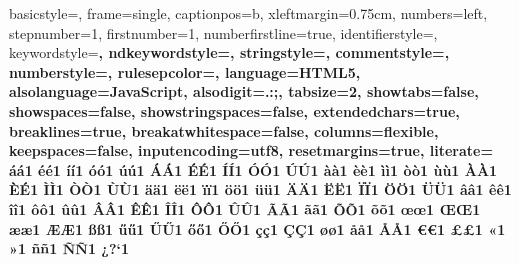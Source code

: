  {%
  basicstyle={\footnotesize\ttfamily},   
  frame=single,
  captionpos=b,
  xleftmargin={0.75cm},
  numbers=left,
  stepnumber=1,
  firstnumber=1,
  numberfirstline=true,	
  identifierstyle=\color{black},
  keywordstyle=\color{blue}\bfseries,
  ndkeywordstyle=\color{editorGreen}\bfseries,
  stringstyle=\color{editorOcher}\ttfamily,
  commentstyle=\color{brown}\ttfamily,
  numberstyle=\color{Gray},
  rulesepcolor=\color{lightgray},
  language=HTML5,
  alsolanguage=JavaScript,
  alsodigit={.:;},	
  tabsize=2,
  showtabs=false,
  showspaces=false,
  showstringspaces=false,
  extendedchars=true,
  breaklines=true,
  breakatwhitespace=false,
  columns=flexible,
  keepspaces=false,
  inputencoding=utf8,
  resetmargins=true,
  literate=
  {á}{{\'a}}1 {é}{{\'e}}1 {í}{{\'i}}1 {ó}{{\'o}}1 {ú}{{\'u}}1
  {Á}{{\'A}}1 {É}{{\'E}}1 {Í}{{\'I}}1 {Ó}{{\'O}}1 {Ú}{{\'U}}1
  {à}{{\`a}}1 {è}{{\`e}}1 {ì}{{\`i}}1 {ò}{{\`o}}1 {ù}{{\`u}}1
  {À}{{\`A}}1 {È}{{\'E}}1 {Ì}{{\`I}}1 {Ò}{{\`O}}1 {Ù}{{\`U}}1
  {ä}{{\"a}}1 {ë}{{\"e}}1 {ï}{{\"i}}1 {ö}{{\"o}}1 {ü}{{\"u}}1
  {Ä}{{\"A}}1 {Ë}{{\"E}}1 {Ï}{{\"I}}1 {Ö}{{\"O}}1 {Ü}{{\"U}}1
  {â}{{\^a}}1 {ê}{{\^e}}1 {î}{{\^i}}1 {ô}{{\^o}}1 {û}{{\^u}}1
  {Â}{{\^A}}1 {Ê}{{\^E}}1 {Î}{{\^I}}1 {Ô}{{\^O}}1 {Û}{{\^U}}1
  {Ã}{{\~A}}1 {ã}{{\~a}}1 {Õ}{{\~O}}1 {õ}{{\~o}}1
  {œ}{{\oe}}1 {Œ}{{\OE}}1 {æ}{{\ae}}1 {Æ}{{\AE}}1 {ß}{{\ss}}1
  {ű}{{\H{u}}}1 {Ű}{{\H{U}}}1 {ő}{{\H{o}}}1 {Ő}{{\H{O}}}1
  {ç}{{\c c}}1 {Ç}{{\c C}}1 {ø}{{\o}}1 {å}{{\r a}}1 {Å}{{\r A}}1
  {€}{{\euro}}1 {£}{{\pounds}}1 {«}{{\guillemotleft}}1
  {»}{{\guillemotright}}1 {ñ}{{\~n}}1 {Ñ}{{\~N}}1 {¿}{{?`}}1
}

